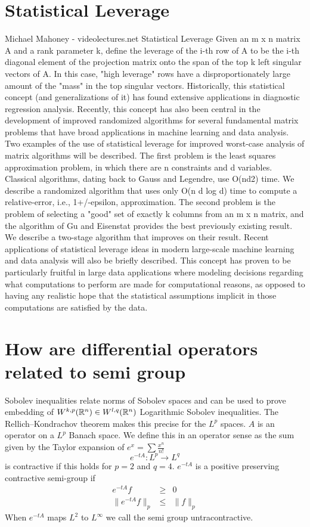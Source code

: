 \section{Statistical Leverage}
Michael Mahoney - videolectures.net Statistical Leverage Given an m x n matrix A and a rank parameter k, define the leverage of the i-th row of A to be the i-th diagonal element of the projection matrix onto the span of the top k left singular vectors of A. In this case, "high leverage" rows have a disproportionately large amount of the "mass" in the top singular vectors. Historically, this statistical concept (and generalizations of it) has found extensive applications in diagnostic regression analysis. Recently, this concept has also been central in the development of improved randomized algorithms for several fundamental matrix problems that have broad applications in machine learning and data analysis. Two examples of the use of statistical leverage for improved worst-case analysis of matrix algorithms will be described. The first problem is the least squares approximation problem, in which there are n constraints and d variables. Classical algorithms, dating back to Gauss and Legendre, use O(nd2) time. We describe a randomized algorithm that uses only O(n d log d) time to compute a relative-error, i.e., 1+/-epsilon, approximation. The second problem is the problem of selecting a "good" set of exactly k columns from an m x n matrix, and the algorithm of Gu and Eisenstat provides the best previously existing result. We describe a two-stage algorithm that improves on their result. Recent applications of statistical leverage ideas in modern large-scale machine learning and data analysis will also be briefly described. This concept has proven to be particularly fruitful in large data applications where modeling decisions regarding what computations to perform are made for computational reasons, as opposed to having any realistic hope that the statistical assumptions implicit in those computations are satisfied by the data.

\section{How are differential operators related to semi group}
Sobolev inequalities relate norms of Sobolev spaces and can be used to prove embedding of $W^{k,p}(\mathbb R^n) \in W^{l,q}(\mathbb R^n)$ Logarithmic Sobolev inequalities.  The Rellich–Kondrachov theorem makes this precise for the $L^p$ spaces.
$A$ is an operator on a $L^p$ Banach space. We define this in an operator sense as the sum given by the Taylor expansion of $e^x = \sum \frac{x^n}{n!}$
\begin{equation*}
  e^{-t A} : L^p \rightarrow L^q
\end{equation*} is contractive if this holds for $p=2$ and $q=4$.
$e^{-t A}$ is a positive preserving contractive semi-group if
\begin{eqnarray*}
  e^{-t A} f &\geq& 0 \\
  \parallel e^{-t A} f \parallel_p &\leq& \parallel f \parallel_p
\end{eqnarray*}
When $e^{-t A}$ maps $L^2$ to $L^\infty$ we call the semi group untracontractive.

